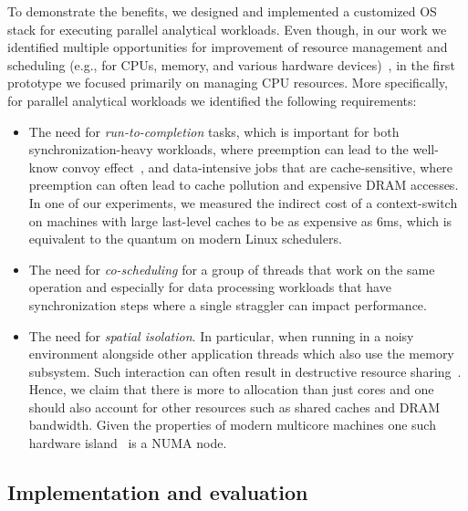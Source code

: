 \documentclass[11pt]{article}
\begin{document}
To demonstrate the benefits, we designed and implemented a customized OS stack for 
executing parallel analytical workloads. Even though, in our work we identified 
multiple opportunities for improvement of resource management and scheduling 
(e.g., for CPUs, memory, and various hardware devices)~\cite{Giceva:damon16}, 
in the first prototype we focused primarily on managing CPU resources. 
More specifically, for parallel analytical workloads we identified the following requirements:
\begin{itemize}
 \item The need for {\it run-to-completion} tasks, which is important for both 
 synchronization-heavy workloads, where preemption can lead to the well-know 
 convoy effect~\cite{Blasgen:1979}, and data-intensive jobs that are 
 cache-sensitive, where preemption can often lead to cache pollution and 
 expensive DRAM accesses. In one of our experiments, we measured the indirect 
 cost of a context-switch on machines with large last-level caches to be as 
 expensive as 6ms, which is equivalent to the quantum on modern Linux schedulers.
 \item The need for {\it co-scheduling} for a group of threads that work on the same
 operation and especially for data processing workloads that have synchronization
 steps where a single straggler can impact performance.
 \item The need for {\it spatial isolation}. In particular, when running in a noisy
 environment alongside other application threads which also use the memory 
 subsystem. Such interaction can often result in destructive resource 
 sharing~\cite{Lee:2009, tang:isca11}. Hence, we claim that there is more to 
 allocation than just cores and one should also account for other resources such as
 shared caches and DRAM bandwidth. Given the properties of modern multicore machines
 one such hardware island~\cite{Porobic:vldb12} is a NUMA node. 
\end{itemize}

\subsection{Implementation and evaluation}
\end{document}

